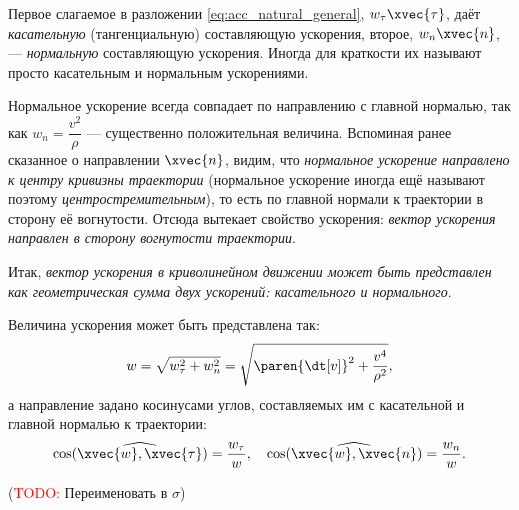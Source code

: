Первое слагаемое в разложении \ref{eq:acc_natural_general}, $w_\tau \xvec{\tau}$,
даёт \textit{касательную} (тангенциальную) составляющую ускорения, второе, $w_n
\xvec{n}$, --- \textit{нормальную} составляющую ускорения. Иногда для краткости
их называют просто касательным и нормальным ускорениями.

Нормальное ускорение всегда совпадает по направлению с главной нормалью, так как
$w_n = \dfrac{v^2}{\rho}$ --- существенно положительная величина. Вспоминая
ранее сказанное о направлении $\xvec{n}$, видим, что \textit{нормальное ускорение
направлено к центру кривизны траектории} (нормальное ускорение иногда ещё
называют поэтому \textit{центростремительным}), то есть по главной нормали к
траектории в сторону её вогнутости. Отсюда вытекает свойство ускорения:
\textit{вектор ускорения направлен в сторону вогнутости траектории}.

Итак, \textit{вектор ускорения в криволинейном движении может быть представлен
как геометрическая сумма двух ускорений: касательного и нормального}.

Величина ускорения может быть представлена так:
\begin{equation}
  w = \sqrt{w_\tau^2 + w_n^2} =
    \sqrt{\paren{\dt[v]}^2 + \frac{v^4}{\rho^2}},
\end{equation}
а направление задано косинусами углов, составляемых им с касательной и главной
нормалью к траектории:
\begin{equation}
  \cos(\widehat{\xvec{w}, \xvec{\tau}}) = \frac{w_\tau}{w}, \quad
  \cos(\widehat{\xvec{w}, \xvec{n}}) = \frac{w_n}{w}.
\end{equation}

(\textcolor{red}{TODO:} Переименовать в $\sigma$)

